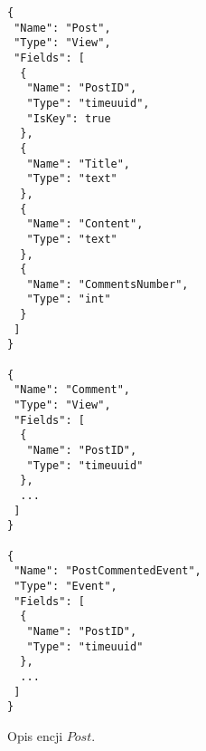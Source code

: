 \begin{figure}[!ht]
\begin{verbatim}
{
 "Name": "Post",
 "Type": "View",
 "Fields": [
  {
   "Name": "PostID",
   "Type": "timeuuid",
   "IsKey": true
  },
  {
   "Name": "Title",
   "Type": "text"
  },
  {
   "Name": "Content",
   "Type": "text"
  },
  {
   "Name": "CommentsNumber",
   "Type": "int"
  }
 ]
}

{
 "Name": "Comment",
 "Type": "View",
 "Fields": [
  {
   "Name": "PostID",
   "Type": "timeuuid"
  },
  ...
 ]
}

{
 "Name": "PostCommentedEvent",
 "Type": "Event",
 "Fields": [
  {
   "Name": "PostID",
   "Type": "timeuuid"
  },
  ...
 ]
}
\end{verbatim}
\caption{Opis encji $Post$.}
\label{fig:single:model_perView}
\end{figure}
